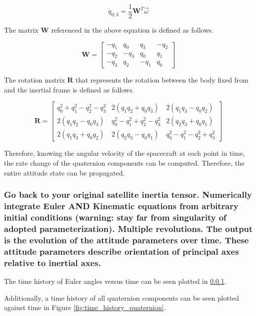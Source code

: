 \begin{equation} \label{eq:quat_rate_change}
    \dot{q}_{0:3} = \frac{1}{2} \boldsymbol{W}^T \vec{\omega}
\end{equation}

The matrix $\boldsymbol{W}$ referenced in the above equation is defined as follows.

\begin{equation*}
    \boldsymbol{W} = \begin{bmatrix}
        -q_1 & q_0 & q_3 & -q_2 \\
        -q_2 & -q_3 & q_0 & q_1 \\
        -q_3 & q_2 & -q_1 & q_0
    \end{bmatrix}
\end{equation*}

The rotation matrix $\boldsymbol{R}$ that represents the rotation between the body fixed from and the inertial frame is defined as follows.

\begin{equation*}
    \boldsymbol{R} = \begin{bmatrix}
        q_0^2 + q_1^2 - q_2^2 - q_3^2 & 2(q_1q_2 + q_0q_3) & 2(q_1q_3 - q_0q_2) \\
        2(q_1q_2 - q_0q_3) & q_0^2 - q_1^2 + q_2^2 - q_3^2 & 2(q_2q_3 + q_0q_1) \\
        2(q_1q_3 + q_0q_2) & 2(q_2q_3 - q_0q_1) & q_0^2 - q_1^2 - q_2^2 + q_3^2
    \end{bmatrix}
\end{equation*}

Therefore, knowing the angular velocity of the spacecraft at each point in time, the rate change of the quaternion components can be computed. Therefore, the entire attitude state can be propagated.

\subsubsection{Go back to your original satellite inertia tensor. Numerically integrate Euler AND Kinematic equations from arbitrary initial conditions (warning: stay far from singularity of adopted parameterization). Multiple revolutions. The output is the evolution of the attitude parameters over time. These attitude parameters describe orientation of principal axes relative to inertial axes.}

The time history of Euler angles versus time can be seen plotted in \ref{}.

Additionally, a time history of all quaternion components can be seen plotted against time in Figure \ref{fig:time_history_quaternion}. 

